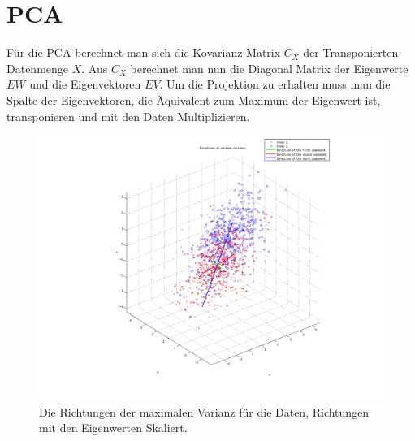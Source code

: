 \section{PCA}

Für die PCA berechnet man sich die Kovarianz-Matrix $C_X$ der Transponierten Datenmenge $X$. Aus $C_X$ berechnet man nun die Diagonal Matrix der Eigenwerte $EW$ und die Eigenvektoren $EV$.
Um die Projektion zu erhalten muss man die Spalte der Eigenvektoren, die Äquivalent zum Maximum der Eigenwert ist, transponieren und mit den Daten Multiplizieren.

\begin{figure}[h!]
  \begin{center}
    \includegraphics[width=1.0\textwidth]{./figures/4_Components}
    \caption{Die Richtungen der maximalen Varianz für die Daten, Richtungen mit den Eigenwerten Skaliert.}
    \label{fig:4_components}
  \end{center}
\end{figure}

